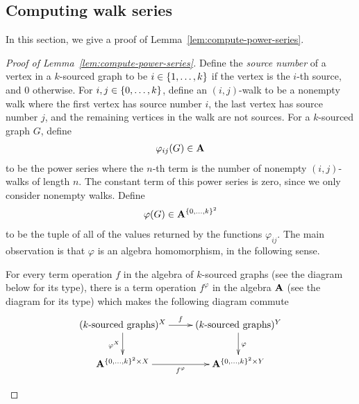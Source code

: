 \subsection{Computing walk series}
In this section, we give a proof of Lemma~\ref{lem:compute-power-series}.
\begin{proof}[Proof of Lemma~\ref{lem:compute-power-series}]
	
	
	Define the \emph{source number} of a vertex in a $k$-sourced graph to be  $i \in \{1,\ldots,k\}$ if the vertex is the $i$-th source, and $0$ otherwise. For
	$i,j \in \{0,\ldots,k\}$,
	define an $(i,j)$-walk to be a nonempty walk where the first vertex has source number $i$, the last vertex has source number $j$, and the remaining vertices in the walk are not sources. For a $k$-sourced graph $G$, define 
	\begin{align*}
	\varphi_{ij}(G) \in \mathbf{A}
	\end{align*}
	to be the power series where the $n$-th term is the number of nonempty $(i,j)$-walks of length $n$. The constant term  of this power series is zero, since we only consider nonempty walks. Define 
	\begin{align*}
	\varphi(G) \in \mathbf{A}^{\{0,\ldots,k\}^2}
	\end{align*}
	to be the tuple of all of the values returned by the functions $\varphi_{ij}$. 
	The main observation is that $\varphi$ is an algebra homomorphism, in the following sense.
	\begin{claim}
		For every term operation $f$ 
		in the algebra of $k$-sourced graphs (see the diagram below for its type), there is a term operation $f^\varphi$ in the algebra $\mathbf{A}$ (see the diagram for its type) which makes the following diagram commute
		\begin{align*}
		\xymatrix{
			(\text{$k$-sourced graphs})^X 
			\ar[r]^f
			\ar[d]_{\varphi^X}
			&
			(\text{$k$-sourced graphs})^Y
			\ar[d]^\varphi
			\\
			\aalg^{\set{0,\ldots,k}^2 \times X}
			\ar[r]_{f^\varphi}
			&
			\aalg^{\set{0,\ldots,k}^2 \times Y}
		}
		\end{align*}

\end{claim}
\end{proof}
